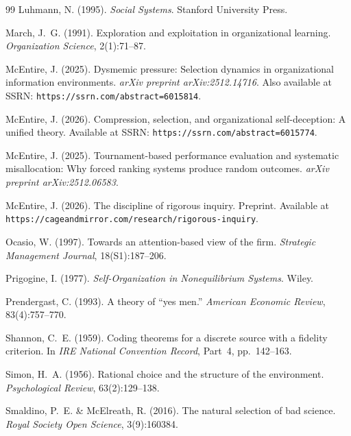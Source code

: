 \documentclass[11pt,a4paper]{article}
\begin{document}
\begin{thebibliography}{99}
Luhmann, N. (1995).
\newblock \emph{Social Systems}.
\newblock Stanford University Press.

March, J.~G. (1991).
\newblock Exploration and exploitation in organizational learning.
\newblock \emph{Organization Science}, 2(1):71--87.

McEntire, J. (2025).
\newblock Dysmemic pressure: Selection dynamics in organizational information environments.
\newblock \emph{arXiv preprint arXiv:2512.14716}. Also available at SSRN: \texttt{https://ssrn.com/abstract=6015814}.

McEntire, J. (2026).
\newblock Compression, selection, and organizational self-deception: A unified theory.
\newblock Available at SSRN: \texttt{https://ssrn.com/abstract=6015774}.

McEntire, J. (2025).
\newblock Tournament-based performance evaluation and systematic misallocation: Why forced ranking systems produce random outcomes.
\newblock \emph{arXiv preprint arXiv:2512.06583}.

McEntire, J. (2026).
\newblock The discipline of rigorous inquiry.
\newblock Preprint. Available at \texttt{https://cageandmirror.com/research/rigorous-inquiry}.

Ocasio, W. (1997).
\newblock Towards an attention-based view of the firm.
\newblock \emph{Strategic Management Journal}, 18(S1):187--206.

Prigogine, I. (1977).
\newblock \emph{Self-Organization in Nonequilibrium Systems}.
\newblock Wiley.

Prendergast, C. (1993).
\newblock A theory of ``yes men.''
\newblock \emph{American Economic Review}, 83(4):757--770.

Shannon, C.~E. (1959).
\newblock Coding theorems for a discrete source with a fidelity criterion.
\newblock In \emph{IRE National Convention Record}, Part~4, pp.~142--163.

Simon, H.~A. (1956).
\newblock Rational choice and the structure of the environment.
\newblock \emph{Psychological Review}, 63(2):129--138.

Smaldino, P.~E. \& McElreath, R. (2016).
\newblock The natural selection of bad science.
\newblock \emph{Royal Society Open Science}, 3(9):160384.


\end{thebibliography}
\end{document}
